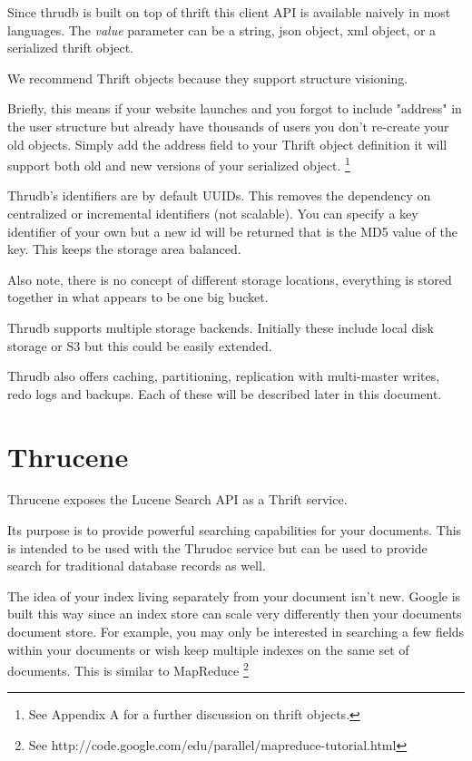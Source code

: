 \documentclass[nocopyrightspace,blockstyle]{sigplanconf}
\begin{document}
Since thrudb is built on top of thrift this client API is available naively in most languages.
The \textit{value} parameter can be a string, json object, xml object, or a serialized thrift object.

We recommend Thrift objects because they support structure visioning.  

Briefly, this means if your website launches and you forgot to include "address" in the user 
structure but already have thousands of users you don't re-create your old objects. Simply add the address field
to your Thrift object definition it will support both old and new versions of your serialized object. 
\footnote{See Appendix A for a further discussion on thrift objects.}

Thrudb's identifiers are by default UUIDs. This removes the dependency on centralized or incremental identifiers (not scalable).
You can specify a key identifier of your own but a new id will be returned that is the MD5 value of the key. 
This keeps the storage area balanced. 

Also note, there is no concept of different storage locations, everything is stored together in what appears to be one big bucket.

Thrudb supports multiple storage backends.  Initially these include local disk storage or S3 but this could be easily extended. 

Thrudb also offers caching, partitioning, replication with multi-master writes, redo logs and backups. Each of these 
will be described later in this document.

\section{Thrucene}

Thrucene exposes the Lucene Search API as a Thrift service.  

Its purpose is to provide powerful searching capabilities for your documents.  
This is intended to be used with the Thrudoc service but can be used to provide search for traditional database records as well. 

The idea of your index living separately from your document isn't new.  
Google is built this way since an index store can scale very differently then your documents document store.  
For example, you may only be interested in searching a few fields within your documents or
wish keep multiple indexes on the same set of documents. This is similar to MapReduce
\footnote{See http://code.google.com/edu/parallel/mapreduce-tutorial.html}
\end{document}
